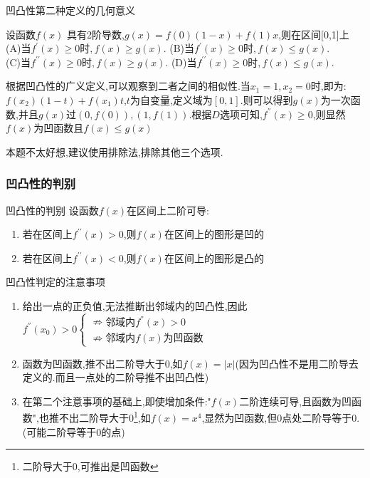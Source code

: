 \documentclass[8pt a4paper, oneside, UTF8]{ctexbook}  %
\begin{document}
\begin{sloppypar}
\begin{criterion}{凹凸性第二种定义的几何意义}{}
\begin{center}
\begin{tikzpicture}[x=0.75pt,y=0.75pt,yscale=-1,xscale=1]
            \end{tikzpicture}
        \end{center}
    \end{criterion}
    \begin{problem}
    设函数$f(x)$ 具有2阶导数,$g(x)=f(0)(1-x)+f(1)x$,则在区间[0,1]上\\
    (A)当$f^\prime(x)\geqslant0$时$,f(x)\geq g(x).$ \quad (B)当$f^\prime(x)\geqslant0$时$,f(x)\leq g(x).$\\
    (C)当$f^{\prime\prime}(x)\geqslant0$时$,f(x)\geqslant g(x).$ \quad (D)当$f^{\prime\prime}(x)\geqslant0$时$,f(x)\leq g(x).$
    \end{problem}
    \begin{solution}
        根据凹凸性的广义定义,可以观察到二者之间的相似性.当$x_1=1,x_2=0$时,即为:$f(x_2)(1-t)+f(x_1)t$,$t$为自变量,定义域为$[0,1]$.则可以得到$g(x)$为一次函数,并且$g(x)$过$(0,f(0)),(1,f(1))$.根据$D$选项可知,$f^{''}(x)\geqslant0$,则显然$f(x)$为凹函数且$f(x)\leqslant g(x)$
    \end{solution}
    \begin{note}
        本题不太好想,建议使用排除法,排除其他三个选项.
    \end{note}
    \subsubsection{凹凸性的判别}
    \begin{defn}{凹凸性的判别}{}
        设函数$f(x)$在区间上二阶可导:
        \begin{enumerate}
            \item 若在区间上$f^{\prime\prime}(x)>0$,则$f(x)$在区间上的图形是凹的
            \item 若在区间上$f^{\prime\prime}(x)<$0,则$f(x)$在区间上的图形是凸的
        \end{enumerate}
    \end{defn}
    \begin{criterion}{凹凸性判定的注意事项}{}
        \begin{enumerate}
            \item 给出一点的正负值,无法推断出邻域内的凹凸性,因此$f^{''}(x_0)>0\begin{cases}
                          \nRightarrow \text{邻域内}f^{''}(x)>0 \\
                          \nRightarrow \text{邻域内}f(x)\text{为凹函数}
                      \end{cases}$
            \item 函数为凹函数,推不出二阶导大于0,如$f(x)=|x|$(因为凹凸性不是用二阶导去定义的.而且一点处的二阶导推不出凹凸性)
            \item 在第二个注意事项的基础上,即使增加条件:"$f(x)$二阶连续可导,且函数为凹函数",也推不出二阶导大于0\footnote{二阶导大于0,可推出是凹函数},如$f(x)=x^4$,显然为凹函数,但0点处二阶导等于0.(可能二阶导等于0的点)
        \end{enumerate}
    \end{criterion}

\end{sloppypar}
\end{document}
